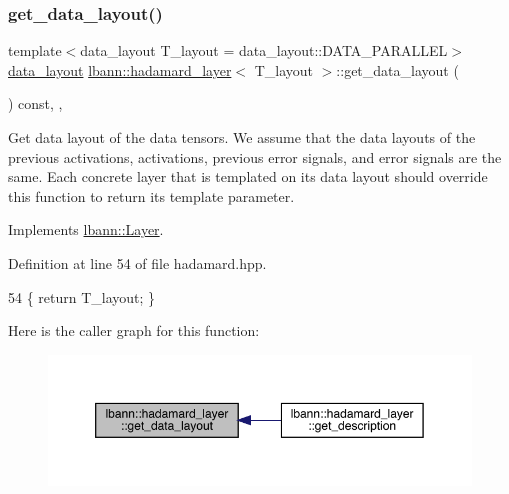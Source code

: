 \mbox{\label{classlbann_1_1hadamard__layer_ac7a67a906eaa7810997fa6448337f192}} 
\subsubsection{\texorpdfstring{get\+\_\+data\+\_\+layout()}{get\_data\_layout()}}
{\footnotesize\ttfamily template$<$data\+\_\+layout T\+\_\+layout = data\+\_\+layout\+::\+D\+A\+T\+A\+\_\+\+P\+A\+R\+A\+L\+L\+EL$>$ \\
\hyperlink{base_8hpp_a786677cbfb3f5677b4d84f3056eb08db}{data\+\_\+layout} \hyperlink{classlbann_1_1hadamard__layer}{lbann\+::hadamard\+\_\+layer}$<$ T\+\_\+layout $>$\+::get\+\_\+data\+\_\+layout (\begin{DoxyParamCaption}{ }\end{DoxyParamCaption}) const\hspace{0.3cm}{\ttfamily [inline]}, {\ttfamily [override]}, {\ttfamily [virtual]}}

Get data layout of the data tensors. We assume that the data layouts of the previous activations, activations, previous error signals, and error signals are the same. Each concrete layer that is templated on its data layout should override this function to return its template parameter. 

Implements \hyperlink{classlbann_1_1Layer_a5dfb66e81fc085997402a5e2241316bd}{lbann\+::\+Layer}.



Definition at line 54 of file hadamard.\+hpp.


\begin{DoxyCode}
54 \{ \textcolor{keywordflow}{return} T\_layout; \}
\end{DoxyCode}
Here is the caller graph for this function\+:\nopagebreak
\begin{figure}[H]
\begin{center}
\leavevmode
\includegraphics[width=350pt]{classlbann_1_1hadamard__layer_ac7a67a906eaa7810997fa6448337f192_icgraph}
\end{center}
\end{figure}
\mbox{\label{classlbann_1_1hadamard__layer_ad575b8b5efddaf3ee64c358b28198de9}} 
